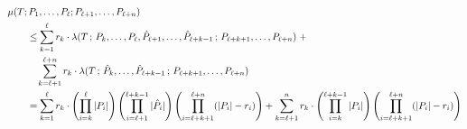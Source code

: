     \begin{align*}
        &\mu(T; P_1, \ldots, P_\ell; P_{\ell+1}, \ldots, P_{\ell+n}) \nonumber\\
        &\qquad\leq    
            \sum_{k=1}^\ell r_k\cdot \lambda(T\,;\,P_{k}, \ldots, P_{\ell}, \hat{P}_{\ell+1}, \ldots, \hat{P}_{\ell+k-1} \,;\, P_{\ell+{k+1}}, \ldots, P_{\ell + n} )
                \;+
                \nonumber\\
                &\qquad\quad 
            \sum_{k=\ell + 1}^{\ell + n} r_k\cdot  \lambda(T\,;\,\hat{P}_{k}, \ldots, \hat{P}_{\ell+k-1}\,;\, P_{\ell+{k+1}}, \ldots, P_{\ell + n})
        \\
        &\qquad =
            \sum_{k=1}^\ell r_k\cdot
                \left(  \prod_{i=k}^{\ell}     
                                                        |P_{i}|      \right)   
                \left(  \prod_{i=\ell + 1}^{\ell+k-1}     
                                                        |\hat{P}_{i}|      \right)   
                \left(  \prod_{i=\ell+k+1}^{\ell+n}     
                                                        (|P_i| - r_i)
                                                                            \right)
                + 
        \sum_{k=\ell+1}^n r_k\cdot
                \left(  \prod_{i=k}^{\ell+ k - 1}        
                                                        |P_i|         \right)
                \left(  \prod_{i=\ell+k+1}^{\ell + n}   
                                                        (|P_i| - r_i)
                                                                            \right)
    \end{align*}
